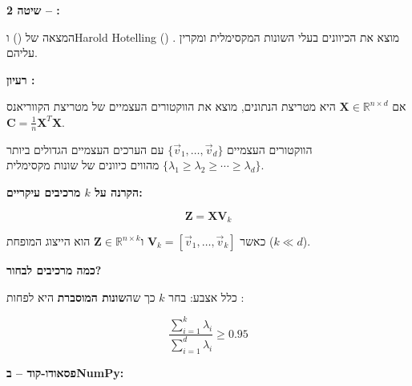 \textbf{שיטה \num{2} – :}

המצאה של  () \cite{pearson1901} ו\en{-}Harold Hotelling () \cite{hotelling1933}.  מוצא את הכיוונים בעלי השונות המקסימלית ומקרין עליהם.

\textbf{רעיון :}

אם $\mathbf{X} \in \mathbb{R}^{n \times d}$ היא מטריצת הנתונים,  מוצא את הווקטורים העצמיים של מטריצת הקווריאנס $\mathbf{C} = \frac{\num{1}}{n}\mathbf{X}^T\mathbf{X}$.

הווקטורים העצמיים $\{\vec{v}_1, \ldots, \vec{v}_d\}$ עם הערכים העצמיים הגדולים ביותר $\{\lambda_1 \geq \lambda_2 \geq \cdots \geq \lambda_d\}$ מהווים כיוונים של שונות מקסימלית.

\textbf{הקרנה על $k$ מרכיבים עיקריים:}

\begin{equation}
\mathbf{Z} = \mathbf{X} \mathbf{V}_k
\end{equation}

כאשר $\mathbf{V}_k = [\vec{v}_1, \ldots, \vec{v}_k]$ ו\en{-}$\mathbf{Z} \in \mathbb{R}^{n \times k}$ הוא הייצוג המופחת ($k \ll d$).

\textbf{כמה מרכיבים לבחור?}

כלל אצבע: בחר $k$ כך שה\textbf{שונות המוסברת} היא לפחות :

\begin{equation}
\frac{\sum_{i=1}^{k} \lambda_i}{\sum_{i=1}^{d} \lambda_i} \geq \num{0.95}
\end{equation}

\textbf{פסאודו-קוד –  ב\en{-}NumPy:}

